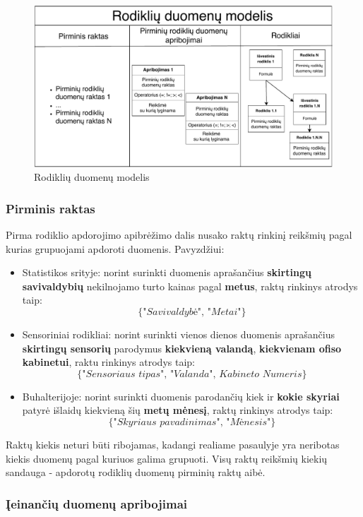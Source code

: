 \documentclass{VUMIFPSbakalaurinis}
\begin{document}
\begin{figure}[H]
    \includegraphics[width=1\textwidth]{img/rodiklio_modelis.pdf}
    \caption{Rodiklių duomenų modelis}
    \label{img:rodiklio_apibrezimas}
\end{figure}

\subsubsection{Pirminis raktas}

Pirma rodiklio apdorojimo apibrėžimo dalis nusako raktų rinkinį reikšmių pagal kurias grupuojami apdoroti duomenis. Pavyzdžiui:
\begin{itemize}
    \item Statistikos srityje: norint surinkti duomenis aprašančius \textbf{skirtingų savivaldybių} nekilnojamo turto kainas pagal \textbf{metus}, raktų rinkinys atrodys taip: \[\{\textit{"Savivaldybė", "Metai"}\}\]
    \item Sensoriniai rodikliai: norint surinkti vienos dienos duomenis aprašančius \textbf{skirtingų sensorių} parodymus \textbf{kiekvieną valandą}, \textbf{kiekvienam ofiso kabinetui}, raktu rinkinys atrodys taip: \[\{\textit{"Sensoriaus tipas", "Valanda", Kabineto Numeris}\}\] 
    \item Buhalterijoje: norint surinkti duomenis parodančių kiek ir \textbf{kokie skyriai} patyrė išlaidų kiekvieną šių \textbf{metų mėnesį}, raktų rinkinys atrodys taip: \[\{\textit{"Skyriaus pavadinimas", "Mėnesis"}\}\] 
\end{itemize}  \par
Raktų kiekis neturi būti ribojamas, kadangi realiame pasaulyje yra neribotas kiekis duomenų pagal kuriuos galima grupuoti. Visų raktų reikšmių kiekių sandauga - apdorotų rodiklių duomenų pirminių raktų aibė. 

\subsubsection{Įeinančių duomenų apribojimai}
\end{document}
